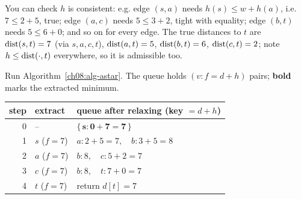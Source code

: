 You can check $h$ is consistent: e.g. edge $(s,a)$ needs $h(s)\le w+h(a)$, i.e.
$7\le 2+5$, true; edge $(a,c)$ needs $5\le 3+2$, tight with equality; edge
$(b,t)$ needs $5\le 6+0$; and so on for every edge. The true distances to $t$ are
$\operatorname{dist}(s,t)=7$ (via $s,a,c,t$), $\operatorname{dist}(a,t)=5$, $\operatorname{dist}(b,t)=6$, $\operatorname{dist}(c,t)=2$;
note $h\le\operatorname{dist}(\cdot,t)$ everywhere, so it is admissible too.

Run Algorithm~\ref{ch08:alg-astar}. The queue holds $(v: f=d+h)$ pairs;
\textbf{bold} marks the extracted minimum.

\begin{center}\small
\begin{tabular}{r l l}
\toprule
step & extract & queue after relaxing (key $=d+h$)\\
\midrule
0 & --        & $\{\,\mathbf{s\!:\!0\!+\!7\!=\!7}\,\}$\\
1 & $s$ ($f=7$) & $a\!:\!2\!+\!5\!=\!7,\quad b\!:\!3\!+\!5\!=\!8$\\
2 & $a$ ($f=7$) & $b\!:\!8,\quad c\!:\!5\!+\!2\!=\!7$\\
3 & $c$ ($f=7$) & $b\!:\!8,\quad t\!:\!7\!+\!0\!=\!7$\\
4 & $t$ ($f=7$) & return $d[t]=7$\\
\bottomrule
\end{tabular}
\end{center}

